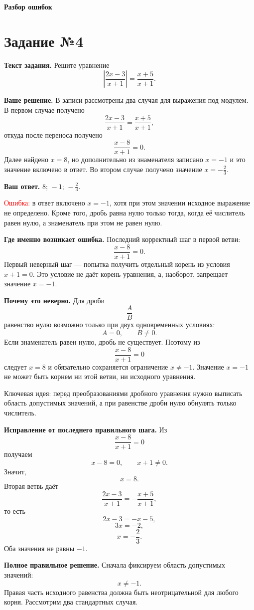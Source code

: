 \documentclass[12pt,a4paper]{article}
\newcommand{\err}{\textcolor{red}{Ошибка:}}
\newcommand{\idea}{\textcolor{blue!60!black}{Ключевая идея:}}
\newcommand{\tasktitle}[1]{\phantomsection\label{task:#1}\section*{Задание №#1}}
\begin{document}
\newpage
\vspace*{0.32\textheight}
\begin{center}
{\LARGE\bfseries Разбор ошибок}
\end{center}
\vfill
\newpage

\tasktitle{4}
\textbf{Текст задания.} Решите уравнение
\[
\left|\frac{2x-3}{x+1}\right|=\frac{x+5}{x+1}.
\]

\textbf{Ваше решение.} В записи рассмотрены два случая для выражения под модулем. В первом случае получено
\[
\frac{2x-3}{x+1}=\frac{x+5}{x+1},
\]
откуда после переноса получено
\[
\frac{x-8}{x+1}=0.
\]
Далее найдено $x=8$, но дополнительно из знаменателя записано $x=-1$ и это значение включено в ответ. Во втором случае получено значение $x=-\frac23$.

\textbf{Ваш ответ.} $8;\,-1;\,-\frac23$.

\err{} в ответ включено $x=-1$, хотя при этом значении исходное выражение не определено. Кроме того, дробь равна нулю только тогда, когда её числитель равен нулю, а знаменатель при этом не равен нулю.

\textbf{Где именно возникает ошибка.} Последний корректный шаг в первой ветви:
\[
\frac{x-8}{x+1}=0.
\]
Первый неверный шаг --- попытка получить отдельный корень из условия $x+1=0$. Это условие не даёт корень уравнения, а, наоборот, запрещает значение $x=-1$.

\textbf{Почему это неверно.} Для дроби
\[
\frac{A}{B}
\]
равенство нулю возможно только при двух одновременных условиях:
\[
A=0,\qquad B\ne0.
\]
Если знаменатель равен нулю, дробь не существует. Поэтому из
\[
\frac{x-8}{x+1}=0
\]
следует $x=8$ и обязательно сохраняется ограничение $x\ne-1$. Значение $x=-1$ не может быть корнем ни этой ветви, ни исходного уравнения.

\idea{} перед преобразованиями дробного уравнения нужно выписать область допустимых значений, а при равенстве дроби нулю обнулять только числитель.

\textbf{Исправление от последнего правильного шага.} Из
\[
\frac{x-8}{x+1}=0
\]
получаем
\[
x-8=0,\qquad x+1\ne0.
\]
Значит,
\[
x=8.
\]
Вторая ветвь даёт
\[
\frac{2x-3}{x+1}=-\frac{x+5}{x+1},
\]
то есть
\[
2x-3=-x-5,
\]
\[
3x=-2,
\]
\[
x=-\frac23.
\]
Оба значения не равны $-1$.

\textbf{Полное правильное решение.} Сначала фиксируем область допустимых значений:
\[
x\ne-1.
\]
Правая часть исходного равенства должна быть неотрицательной для любого корня. Рассмотрим два стандартных случая.
\end{document}
